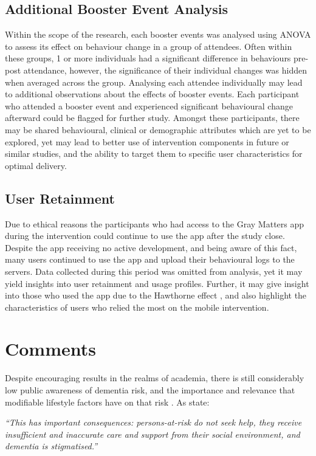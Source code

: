 \subsection{Additional Booster Event Analysis}
Within the scope of the research, each booster events was analysed using ANOVA to assess its effect on behaviour change in a group of attendees. Often within these groups, 1 or more individuals had a significant difference in behaviours pre-post attendance, however, the significance of their individual changes was hidden when averaged across the group.
Analysing each attendee individually may lead to additional observations about the effects of booster events. Each participant who attended a booster event and experienced significant behavioural change afterward could be flagged for further study. Amongst these participants, there may be shared behavioural, clinical or demographic attributes which are yet to be explored, yet may lead to better use of intervention components in future or similar studies, and the ability to target them to specific user characteristics for optimal delivery.

\subsection{User Retainment}
Due to ethical reasons the participants who had access to the Gray Matters app during the intervention could continue to use the app after the study close. Despite the app receiving no active development, and being aware of this fact, many users continued to use the app and upload their behavioural logs to the servers. Data collected during this period was omitted from analysis, yet it may yield insights into user retainment and usage profiles. Further, it may give insight into those who used the app due to the Hawthorne effect \cite{McCarney2007}, and also highlight the characteristics of users who relied the most on the mobile intervention.

\section{Comments}
Despite encouraging results in the realms of academia, there is still considerably low public awareness of dementia risk, and the importance and relevance that modifiable lifestyle factors have on that risk \cite{FarrowM2008}. As \citeauthor{Deckers2015} state:
\begin{displayquote}
\textit{``This has important consequences: persons-at-risk do not seek help, they receive insufficient and inaccurate care and support from their social environment, and dementia is stigmatised.''} \cite{Deckers2015}
\end{displayquote}

